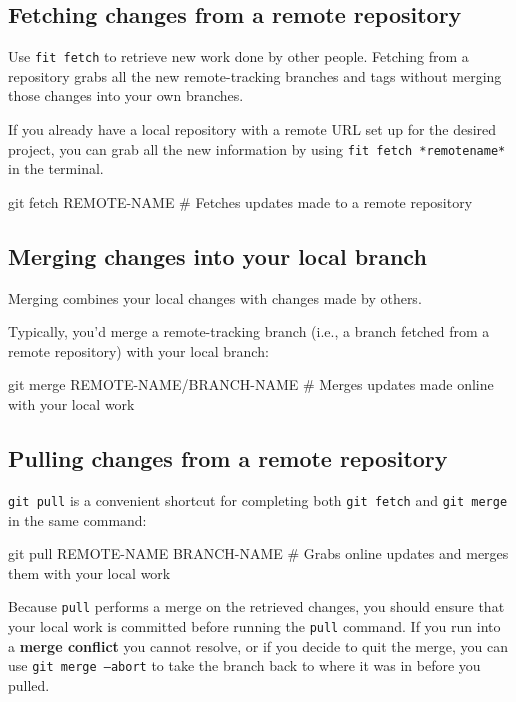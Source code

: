 \subsection{Fetching changes from a remote repository}

Use \texttt{fit fetch} to retrieve new work done by other people. Fetching from a repository grabs all the new remote-tracking branches and tags without merging those changes into your own branches.

If you already have a local repository with a remote URL set up for the desired project, you can grab all the new information by using \texttt{fit fetch *remotename*} in the terminal.

\begin{codeblock}[language=bash]
git fetch REMOTE-NAME 
# Fetches updates made to a remote repository 
\end{codeblock}

\subsection{Merging changes into your local branch}

Merging combines your local changes with changes made by others.

Typically, you'd merge a remote-tracking branch (i.e., a branch fetched from a remote repository) with your local branch:
\begin{codeblock}[language=bash]
git merge REMOTE-NAME/BRANCH-NAME 
# Merges updates made online with your local work 
\end{codeblock}

\subsection{Pulling changes from a remote repository}

\texttt{git pull} is a convenient shortcut for completing both \texttt{git fetch} and \texttt{git merge} in the same command:
\begin{codeblock}[language=bash]
git pull REMOTE-NAME BRANCH-NAME 
# Grabs online updates and merges them with your local work 
\end{codeblock}

Because \texttt{pull} performs a merge on the retrieved changes, you should ensure that your local work is committed before running the \texttt{pull} command. If you run into a \textbf{merge conflict} you cannot resolve, or if you decide to quit the merge, you can use \texttt{git merge --abort} to take the branch back to where it was in before you pulled. 
